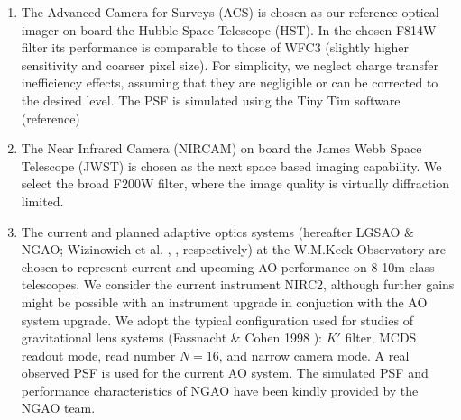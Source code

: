 \documentclass[a4paper,11pt]{article}
\begin{document}
\begin{enumerate}

\item  The Advanced Camera for Surveys (ACS) is chosen as our reference optical imager on board the Hubble Space Telescope (HST). In the chosen F814W filter its performance is comparable to those of WFC3 (slightly higher sensitivity and coarser pixel size). For simplicity, we neglect charge transfer inefficiency effects, assuming that they are negligible or can be corrected to the desired level. The PSF is simulated using the Tiny Tim software (reference)
    
\item The Near Infrared Camera (NIRCAM) on board the James Webb Space Telescope (JWST) is chosen as the next space based imaging capability. We select the broad F200W filter, where the image quality is virtually diffraction limited. 


\item The current and planned adaptive optics systems (hereafter LGSAO \& NGAO; Wizinowich et al. \citep{2006PASP..118..297W}, \citep{2010SPIE.7736E..0KW}, respectively) at the W.M.Keck Observatory are chosen to represent current and upcoming AO performance on 8-10m class telescopes. We consider the current instrument NIRC2, although further gains might be possible with an instrument upgrade in conjuction with the AO system upgrade. We adopt the typical configuration used for studies of gravitational lens systems (Fassnacht \& Cohen 1998 \citep{1998AJ....115..377F}): $K'$ filter, MCDS readout mode, read number $N=16$, and narrow camera mode. A real observed PSF is used for the current AO system. The simulated PSF and performance characteristics of NGAO have been kindly provided by the NGAO team.
    

\end{enumerate}
\end{document}

